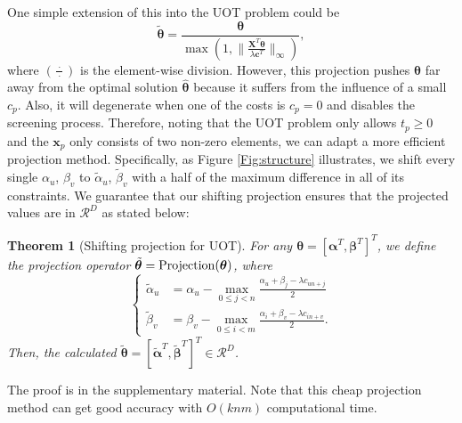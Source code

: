 \documentclass[twoside]{article}
\theoremstyle{plain}
\newtheorem{thm}{Theorem}
\newcommand{\mat}[1]{\mathbf{#1}}
\renewcommand{\vec}[1]{\bm{#1}}
\begin{document}
One simple extension of this into the UOT problem could be  
\begin{equation*}
\tilde{\vec{\theta}} = \frac{\vec\theta}{\max(1, \|\frac{\mat{X}^T\vec\theta}{\lambda \vec{c}^{T}}\|_{\infty})}, 
\end{equation*}
where $(\frac{\ \cdot\ }{\cdot})$ is the element-wise division. However, this projection pushes $\vec{\theta}$ far away from the optimal solution $\hat{\vec{\theta}}$ because it suffers from the influence of a small $c_p$. Also, it will degenerate when one of the costs is $c_p = 0$ and disables the screening process. 
%
Therefore, noting that the UOT problem only allows $t_p \geq 0$ and the $\vec{x}_p$ only consists of two non-zero elements, we can adapt a more efficient projection method. Specifically, as Figure \ref{Fig:structure} illustrates, we shift every single $\alpha_u$, $\beta_v$ to $\tilde{\alpha}_u$, $\tilde{\beta}_v$ with a half of the maximum difference in all of its constraints. We guarantee that our shifting projection ensures that the projected values are in $\mathcal{R}^{D}$ as stated below:
%
\begin{thm}[Shifting projection for UOT]
\label{Thm:UOT_ShiftProjection}
For any $\vec{\theta} = [{\vec{\alpha}}^T,{\vec{\beta}}^T]^T$, we define the projection operator $\tilde{\vec{\theta}}={\rm Projection}(\vec{\theta})$, where 
\begin{equation}
\left\{
\begin{array}{ll}
\label{eq:uotproj}
\tilde{{\alpha}}_u &= \displaystyle{{{\alpha}}_u - \max_{0\leq j < n} \frac{{{\alpha}}_u +{{\beta}}_j - \lambda{c}_{un+j}}{2}} \\
\tilde{{\beta}}_v &= \displaystyle{{{\beta}}_v - \max_{0 \leq i < m} \frac{{{\alpha}}_i +{{\beta}}_v - \lambda{c}_{in+v}}{2}}.
\end{array}
\right.
\end{equation}
Then, the calculated $\tilde{\vec{\theta}} = [\tilde{\vec{\alpha}}^T,\tilde{\vec{\beta}}^T]^T \in \mathcal{R}^{D}$.
\end{thm}
The proof is in the supplementary material. Note that this cheap projection method can get good accuracy with $O(knm)$ computational time. 
\end{document}
